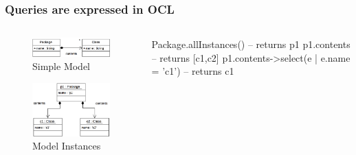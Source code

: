 \documentclass[10pt]{beamer}
\begin{document}
\begin{frame}[fragile]\frametitle{Queries are expressed in OCL}
	
	\begin{columns}
		\begin{column}{0.5\textwidth}
	    \begin{figure}[htbp]
		    \centering
			  \includegraphics[width=\textwidth]{mogwai-model.png}
		    \caption{Simple Model}
	    \end{figure}
	    \begin{figure}[htbp]
		    \centering
			  \includegraphics[width=\textwidth]{mogwai-instances.png}
		    \caption{Model Instances}
	    \end{figure}		
		\end{column}
		\begin{column}{0.5\textwidth}
		  \begin{ocl}
        Package.allInstances()  -- returns p1
        p1.contents				-- returns [c1,c2]
        p1.contents->select(e | e.name = 'c1') 
		    -- returns c1
		  \end{ocl}
		\end{column}
	\end{columns}
\end{frame}
\end{document}
